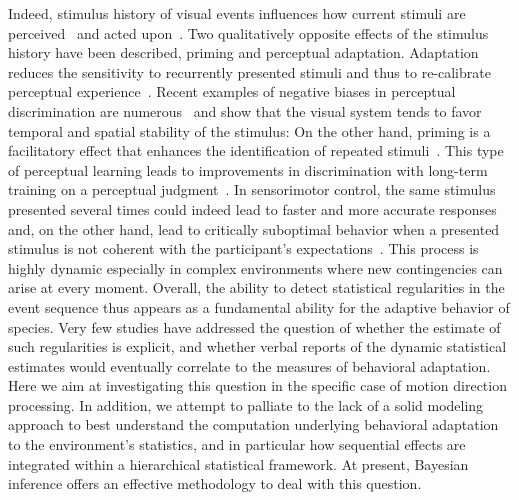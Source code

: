 \documentclass[12pt,english]{article}%
\newcommand{\citep}[1]{\parencite{#1}}
\begin{document}
Indeed, stimulus history of visual events influences
how current stimuli are perceived~\citep{Sotiropoulos2011, Adams12} and acted upon~\citep{Carpenter1995, Maus2015,Damasse18}.
Two qualitatively opposite effects of the stimulus history have been described, priming and perceptual adaptation. Adaptation reduces
the sensitivity to recurrently presented stimuli and
thus to re-calibrate perceptual experience~\citep{Clifford2007, Webster2011, Kohn2007}.
Recent examples of negative biases in perceptual discrimination are
numerous~\citep{REFFS} and show that the visual system tends
to favor temporal and spatial stability of the stimulus:
On the other hand, priming is a facilitatory effect that
enhances the identification of repeated stimuli~\citep{Verstraten1994, Tiest2009}.
This type of perceptual learning leads to improvements in discrimination
with long-term training on a perceptual judgment~\citep{Lu2009}.
In sensorimotor control, the same stimulus presented several times could indeed
lead to faster and more accurate responses and,
on the other hand, lead to critically suboptimal behavior
when a presented stimulus is not coherent
with the participant's expectations~\citep{Hyman1953, Yu2009}.
This process is highly dynamic especially in complex environments
where new contingencies can arise at every moment.
Overall, the ability to detect statistical regularities in the event sequence
thus appears as a fundamental ability
for the adaptive behavior of species. Very few studies have addressed the question of whether
the estimate of such regularities is explicit, and whether verbal reports of the dynamic statistical
estimates would eventually correlate to the measures of behavioral adaptation. Here we aim at investigating this question in the specific case of motion direction processing.
In addition, we attempt to palliate to the lack of a solid modeling approach to best understand the computation underlying behavioral adaptation to the environment's statistics,
and in particular how sequential effects are integrated
within a hierarchical statistical framework.
At present, Bayesian inference offers an effective methodology
to deal with this question.
\end{document}
